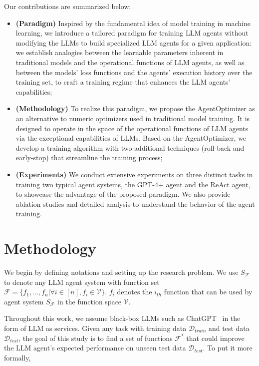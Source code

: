 \documentclass{article}
\theoremstyle{plain}
\theoremstyle{definition}
\theoremstyle{remark}
\begin{document}
Our contributions are summarized below:
\begin{itemize}
    \item \textbf{(Paradigm)} Inspired by the fundamental idea of model training in machine learning, we introduce a tailored paradigm for training LLM agents without modifying the LLMs to build specialized LLM agents for a given application: we establish analogies between the learnable parameters inherent in traditional models and the operational functions of LLM agents, as well as between the models' loss functions and the agents' execution history over the training set, to craft a training regime that enhances the LLM agents' capabilities;
    \item \textbf{(Methodology)} To realize this paradigm, we propose the AgentOptimizer as an alternative to numeric optimizers used in traditional model training. It is designed to operate in the space of the operational functions of LLM agents via the exceptional capabilities of LLMs. Based on the AgentOptimizer, we develop a training algorithm with two additional techniques (roll-back and early-stop) that streamline the training process; 
    \item \textbf{(Experiments)} We conduct extensive experiments on three distinct tasks in training two typical agent systems, the GPT-4+ agent and the ReAct agent, to showcase the advantage of the proposed paradigm. We also provide ablation studies and detailed analysis to understand the behavior of the agent training.
\end{itemize}



\section{Methodology}


We begin by defining notations and setting up the research problem. 
We use $S_{\mathcal{F}}$ to denote any LLM agent system with function set $\mathcal{F}=\{f_{1}, ..., f_{n} | \forall i \in [n], f_{i} \in \mathcal{V}\}$. $f_{i}$ denotes the $i_{th}$ function that can be used by agent system $S_{\mathcal{F}}$ in the function space $\mathcal{V}$.

Throughout this work, we assume black-box LLMs such as ChatGPT~\cite{openai2022gpt} in the form of LLM as services.
Given any task with training data $\mathcal{D}_{train}$ and test data $\mathcal{D}_{test}$, the goal of this study is to find a set of functions $\mathcal{F^{*}}$ that could improve the LLM agent's expected performance on unseen test data $\mathcal{D}_{test}$. To put it more formally, 
\end{document}
